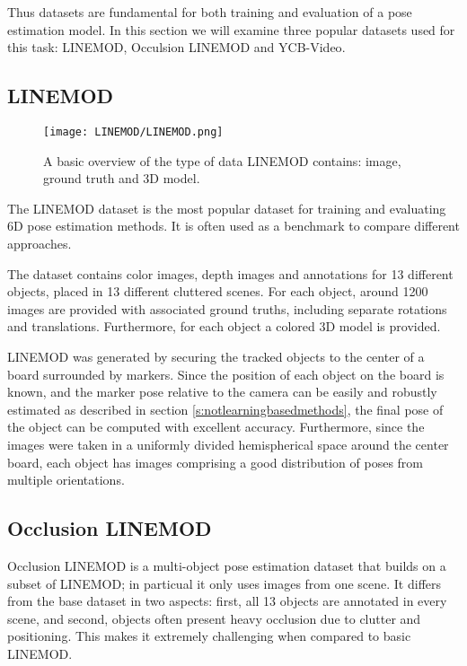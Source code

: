 Thus datasets are fundamental for both training and evaluation of a pose estimation model. In this section we will examine three popular datasets used for this task: LINEMOD\cite{linemod}, Occulsion LINEMOD\cite{occlusionlinemod} and YCB-Video\cite{PoseCNN}.

\subsection{LINEMOD}
\label{ss:LINEMOD}

\begin{figure}[ht]
    \centering
    \texttt{[image: LINEMOD/LINEMOD.png]}
    \caption{A basic overview of the type of data LINEMOD contains: image, ground truth and 3D model.}
    \label{fig:linemod}
\end{figure}

The LINEMOD\cite{linemod} dataset is the most popular dataset for training and evaluating 6D pose estimation methods. It is often used as a benchmark to compare different approaches.

The dataset contains color images, depth images and annotations for 13 different objects, placed in 13 different cluttered scenes. For each object, around 1200 images are provided with associated ground truths, including separate rotations and translations. Furthermore, for each object a colored 3D model is provided.

LINEMOD was generated by securing the tracked objects to the center of a board surrounded by markers. Since the position of each object on the board is known, and the marker pose relative to the camera can be easily and robustly estimated as described in section \ref{s:notlearningbasedmethods}, the final pose of the object can be computed with excellent accuracy. Furthermore, since the images were taken in a uniformly divided hemispherical space around the center board, each object has images comprising a good distribution of poses from multiple orientations.

\subsection{Occlusion LINEMOD}

Occlusion LINEMOD\cite{occlusionlinemod} is a multi-object pose estimation dataset that builds on a subset of LINEMOD; in particual it only uses images from one scene. It differs from the base dataset in two aspects: first, all 13 objects are annotated in every scene, and second, objects often present heavy occlusion due to clutter and positioning. This makes it extremely challenging when compared to basic LINEMOD.

